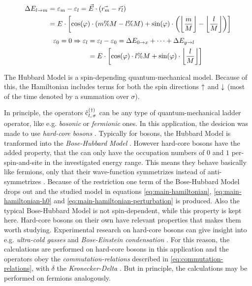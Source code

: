 \begin{equation}
    \label{eq:energy-difference-hopping}
    \begin{split}
        \Delta E_{l \rightarrow m} &=  \epsl[m] - \epsl[l] = \vec{E} \cdot \left(\vec{r_m}-\vec{r_l}\right)\\
        &= E \cdot \left[\cos(\varphi)\cdot \left(m \% M-l \% M\right) + \sin(\varphi)\cdot \left(\floor[\bigg]{\frac{m}{M}}-\floor[\bigg]{\frac{l}{M}}\right)\right]
    \end{split}
\end{equation}
\vspace{0.5cm} %
\begin{equation}
    \label{eq:epsl}
    \begin{split}
        \epsl[0] = 0 \Rightarrow
        \epsl[l] &= \epsl[l] - \epsl[0] = \Delta E_{0 \rightarrow x} + \dots + \Delta E_{y \rightarrow l}\\
        &= E \cdot \left[\cos(\varphi)\cdot l \% M + \sin(\varphi)\cdot \floor[\bigg]{\frac{l}{M}}\right]
    \end{split}
\end{equation}

The Hubbard Model \cite{hubbardModelOriginalDerivation} is a spin-depending quantum-mechanical model. 
Because of this, the Hamiltonian includes terms for both the spin directions $\up$ and $\down$ (most of the time denoted by a summation over $\sigma$).

In principle, the operators $\withspinop[]{l}{\sigma}{(\dagger)}$ can be any type of quantum-mechanical ladder operator, like e.g. \emph{bosonic} or \emph{fermionic} ones.
In this application, the desicion was made to use \emph{hard-core bosons} \cite[]{hardCoreBosonsBasics}.
Typically for bosons, the Hubbard Model is tranformed into the \emph{Bose-Hubbard Model} \cite{boseHubbardModelOriginalDerivation}.
However hard-core bosons have the added property, that the can only have the occupation numbers of $0$ and $1$ per-spin-and-site in the investigated energy range.
This means they behave basically like fermions, only that their wave-function symmetrizes instead of anti-symmetrizes \cite{schwablBook}.
Because of the restriction one term of the Bose-Hubbard Model drops out and the studied model in equations \ref{eq:main-hamiltonian}, \ref{eq:main-hamiltonian-h0} and \ref{eq:main-hamiltonian-perturbation} is produced.
Also the typical Bose-Hubbard Model is not spin-dependent, while this property is kept here.
Hard-core bosons on their own have relevant properties that makes them worth studying. 
Experimental research on hard-core bosons can give insight into e.g. \emph{ultra-cold gasses} and \emph{Bose-Einstein condensation} \cite{hardCoreBosonsBasics}.
For this reason, the calculations are performed on hard-core bosons in this application and the operators obey the \emph{commutation-relations} described in \autoref{eq:commutation-relations}, with $\delta$ the \emph{Kronecker-Delta} \cite{schwablBookII}. 
But in principle, the calculations may be performed on fermions analogously. 

